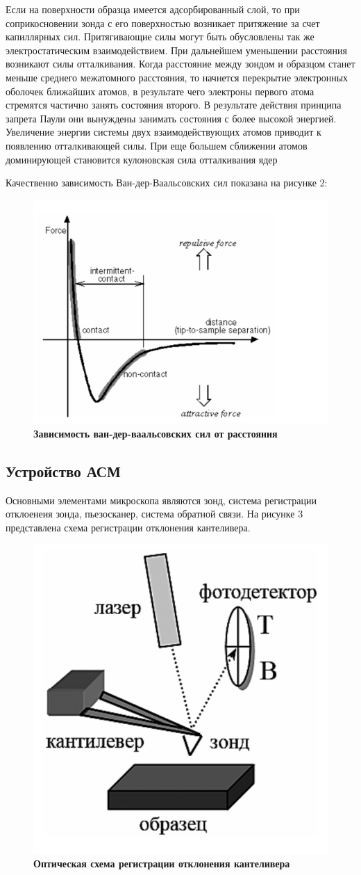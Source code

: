 \documentclass[a4paper]{article}
\begin{document}
Если на поверхности образца имеется адсорбированный слой, то при соприкосновении зонда с его поверхностью возникает притяжение за счет капиллярных сил. Притягивающие силы могут быть обусловлены так же электростатическим взаимодействием. При дальнейшем уменьшении расстояния возникают силы отталкивания. Когда расстояние между зондом и образцом станет меньше среднего межатомного расстояния, то начнется перекрытие электронных оболочек ближайших атомов, в результате чего электроны первого атома стремятся частично занять состояния второго. В результате действия принципа запрета Паули они вынуждены занимать состояния с более высокой
энергией. Увеличение энергии системы двух взаимодействующих атомов приводит к появлению отталкивающей силы.
При еще большем сближении атомов доминирующей становится кулоновская сила отталкивания ядер

Качественно зависимость Ван-дер-Ваальсовских сил показана на рисунке 2:
\begin{figure}[H]
\centering
	\includegraphics[width=0.6\linewidth]{pic2.png}
		\caption{{\bf {Зависимость ван-дер-ваальсовских сил от расстояния}}}
   	\label{fig:2}
\end{figure}
\subsection{Устройство АСМ}
Основными элементами микроскопа являются зонд, система регистрации отклоенеия зонда, пьезосканер, система обратной связи. На рисунке 3 представлена схема регистрации отклонения кантеливера.
\begin{figure}[H]
\centering
	\includegraphics[width=0.3\linewidth]{pic3.png}
		\caption{{\bf {Оптическая схема регистрации отклонения кантеливера}}}
   	\label{fig:1}
\end{figure}
\end{document}
